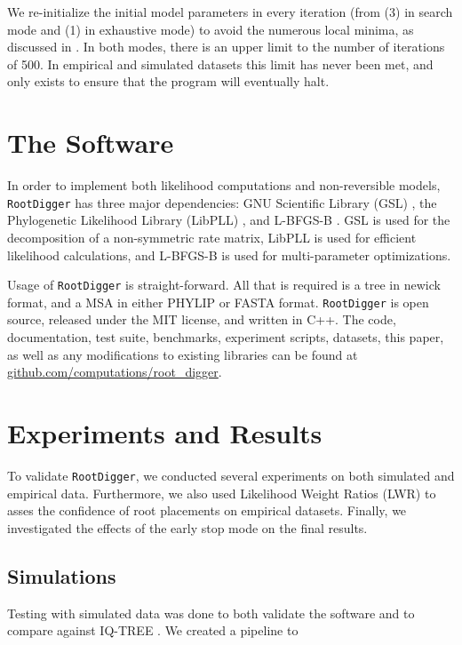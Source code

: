 \documentclass{article}
\newcommand{\RootDiggertt}{\texttt{RootDigger}}
\begin{document}
We re-initialize the initial model parameters in every iteration (from (3) in
search mode and (1) in exhaustive mode) to avoid the numerous local minima, as
discussed in \cite{huelsenbeck_inferring_2002}. In both modes, there is an upper
limit to the number of iterations of 500. In empirical and simulated datasets
this limit has never been met, and only exists to ensure that the program will
eventually halt.

\section{The Software}

In order to implement both likelihood computations and non-reversible models,
\RootDiggertt{} has three major dependencies: GNU Scientific Library (GSL)
\cite{gough_gnu_2009}, the Phylogenetic Likelihood Library (LibPLL)
\cite{flouri_phylogenetic_2015}, and L-BFGS-B \cite{zhu_algorithm_1997}.  GSL is
used for the decomposition of a non-symmetric rate matrix, LibPLL is used for
efficient likelihood calculations, and L-BFGS-B is used for multi-parameter
optimizations.

Usage of \RootDiggertt{} is straight-forward. All that is required is a 
tree in newick format, and a MSA in either PHYLIP
or FASTA format. \RootDiggertt{} is open source, released under the MIT license,
and written in C++. The code, documentation, test suite, benchmarks, experiment
scripts, datasets, this paper, as well as any modifications to existing
libraries can be found at \url{github.com/computations/root_digger}.

\section{Experiments and Results}

To validate \RootDiggertt{}, we conducted several experiments on both simulated
and empirical data. Furthermore, we also used Likelihood Weight Ratios (LWR)
\cite{strimmer_inferring_2002} to asses the confidence of root placements on
empirical datasets. Finally, we investigated the effects of the early stop mode on the
final results.

\subsection{Simulations}

Testing with simulated data was done to both validate the software and to
compare against IQ-TREE \cite{minh_iq-tree_2019}.
We created a pipeline to
\end{document}
